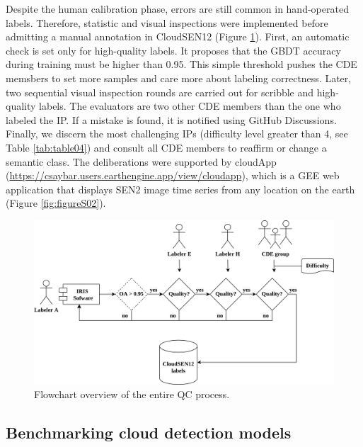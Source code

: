 \documentclass[a4paper, nobind]{templates/cdethesis}
\begin{document}
Despite the human calibration phase, errors are still common in hand-operated labels. Therefore, statistic and visual inspections were implemented before admitting a manual annotation in CloudSEN12 (Figure \ref{fig:figure08}). First, an automatic check is set only for high-quality labels. It proposes that the GBDT accuracy during training must be higher than 0.95. This simple threshold pushes the CDE memsbers to set more samples and care more about labeling correctness. Later, two sequential visual inspection rounds are carried out for scribble and high-quality labels. The evaluators are two other CDE members than the one who labeled the IP. If a mistake is found, it is notified using GitHub Discussions\cite{Hata2022}. Finally, we discern the most challenging IPs (difficulty level greater than 4, see Table \ref{tab:table04}) and consult all CDE members to reaffirm or change a semantic class. The deliberations were supported by cloudApp (\href{https://csaybar.users.earthengine.app/view/cloudapp}{https://csaybar.users.earthengine.app/view/cloudapp}), which is a GEE web application that displays SEN2 image time series from any location on the earth (Figure \ref{fig:figureS02}).

\begin{figure}[!h]
    \centering
    \includegraphics[width=0.98\linewidth]{figures/chapter01/figure08.png}
    \caption{Flowchart overview of the entire QC process.}
    \label{fig:figure08}
\end{figure}

\hypertarget{benchmarking-cloud-detection-models}{%
\subsection{Benchmarking cloud detection models}\label{benchmarking-cloud-detection-models}}
\end{document}
